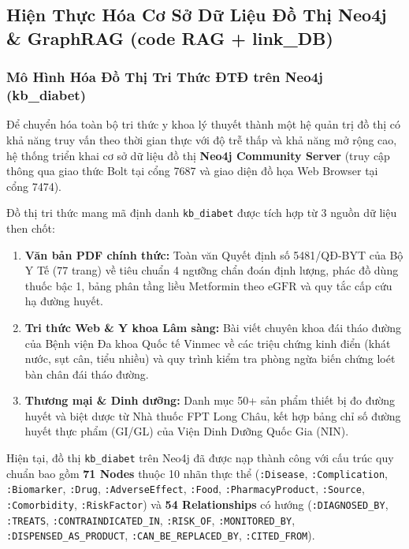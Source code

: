 \documentclass[12pt,a4paper]{article}
\begin{document}
\subsection{Hiện Thực Hóa Cơ Sở Dữ Liệu Đồ Thị Neo4j \& GraphRAG (code RAG + link\_DB)}

\subsubsection{Mô Hình Hóa Đồ Thị Tri Thức ĐTĐ trên Neo4j (kb\_diabet)}
Để chuyển hóa toàn bộ tri thức y khoa lý thuyết thành một hệ quản trị đồ thị có khả năng truy vấn theo thời gian thực với độ trễ thấp và khả năng mở rộng cao, hệ thống triển khai cơ sở dữ liệu đồ thị \textbf{Neo4j Community Server} (truy cập thông qua giao thức Bolt tại cổng 7687 và giao diện đồ họa Web Browser tại cổng 7474).

Đồ thị tri thức mang mã định danh \texttt{kb\_diabet} được tích hợp từ 3 nguồn dữ liệu then chốt:
\begin{enumerate}[leftmargin=1.2cm]
    \item \textbf{Văn bản PDF chính thức:} Toàn văn Quyết định số 5481/QĐ-BYT của Bộ Y Tế (77 trang) về tiêu chuẩn 4 ngưỡng chẩn đoán định lượng, phác đồ dùng thuốc bậc 1, bảng phân tầng liều Metformin theo $\text{eGFR}$ và quy tắc cấp cứu hạ đường huyết.
    \item \textbf{Tri thức Web \& Y khoa Lâm sàng:} Bài viết chuyên khoa đái tháo đường của Bệnh viện Đa khoa Quốc tế Vinmec về các triệu chứng kinh điển (khát nước, sụt cân, tiểu nhiều) và quy trình kiểm tra phòng ngừa biến chứng loét bàn chân đái tháo đường.
    \item \textbf{Thương mại \& Dinh dưỡng:} Danh mục 50+ sản phẩm thiết bị đo đường huyết và biệt dược từ Nhà thuốc FPT Long Châu, kết hợp bảng chỉ số đường huyết thực phẩm (GI/GL) của Viện Dinh Dưỡng Quốc Gia (NIN).
\end{enumerate}

Hiện tại, đồ thị \texttt{kb\_diabet} trên Neo4j đã được nạp thành công với cấu trúc quy chuẩn bao gồm \textbf{71 Nodes} thuộc 10 nhãn thực thể (\texttt{:Disease}, \texttt{:Complication}, \texttt{:Biomarker}, \texttt{:Drug}, \texttt{:AdverseEffect}, \texttt{:Food}, \texttt{:PharmacyProduct}, \texttt{:Source}, \texttt{:Comorbidity}, \texttt{:RiskFactor}) và \textbf{54 Relationships} có hướng (\texttt{:DIAGNOSED\_BY}, \texttt{:TREATS}, \texttt{:CONTRAINDICATED\_IN}, \texttt{:RISK\_OF}, \texttt{:MONITORED\_BY}, \texttt{:DISPENSED\_AS\_PRODUCT}, \texttt{:CAN\_BE\_REPLACED\_BY}, \texttt{:CITED\_FROM}).
\end{document}
